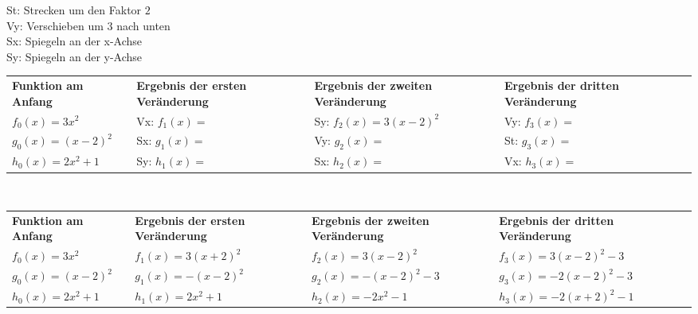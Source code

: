 \documentclass[a4paper,ngerman,12pt]{exam}
\begin{document}
\begin{questions}
  St: Strecken um den Faktor $2$\\
  Vy: Verschieben um 3 nach unten\\
  Sx: Spiegeln an der x-Achse\\
  Sy: Spiegeln an der y-Achse\\
  \begin{table}[h!]
    \begin{tabular}{|m{3cm}|m{4cm}|m{4cm}|m{4cm}|l}
      \cline{1-4}
      \textbf{Funktion am Anfang} & \textbf{Ergebnis der ersten Veränderung} & \textbf{Ergebnis der zweiten Veränderung} & \textbf{Ergebnis der dritten Veränderung} & \\[4ex] \cline{1-4}
      $f_0(x)=3x^2$               & Vx: $f_1(x)=$                            & Sy: $f_2(x)=3(x-2)^2$                     & Vy: $f_3(x)=$                             & \\[3ex] \cline{1-4}
      $g_0(x)=(x-2)^2$            & Sx: $g_1(x)=$                            & Vy: $g_2(x)=$                             & St: $g_3(x)=$                             & \\[3ex] \cline{1-4}
      $h_0(x)=2x^2+1$             & Sy: $h_1(x)=$                            & Sx: $h_2(x)=$                             & Vx: $h_3(x)=$                             & \\[3ex] \cline{1-4}
    \end{tabular}
  \end{table}
  \begin{solution}\phantom{x}\\
    \begin{small}
      \begin{tabular}{|m{2.5cm}|m{3.5cm}|m{3.5cm}|m{4cm}|l}
        \cline{1-4}
        \textbf{Funktion am Anfang} & \textbf{Ergebnis der ersten Veränderung} & \textbf{Ergebnis der zweiten Veränderung} & \textbf{Ergebnis der dritten Veränderung} & \\[4ex] \cline{1-4}
        $f_0(x)=3x^2$               & $f_1(x)=3(x+2)^2$                        & $f_2(x)=3(x-2)^2$                         & $f_3(x)=3(x-2)^2-3$                       & \\[3ex] \cline{1-4}
        $g_0(x)=(x-2)^2$            & $g_1(x)=-(x-2)^2$                        & $g_2(x)=-(x-2)^2-3$                       & $g_3(x)=-2(x-2)^2-3$                      & \\[3ex] \cline{1-4}
        $h_0(x)=2x^2+1$             & $h_1(x)=2x^2+1$                          & $h_2(x)=-2x^2-1$                          & $h_3(x)=-2(x+2)^2-1$                      & \\[3ex] \cline{1-4}
      \end{tabular}
    \end{small}
  \end{solution}

\end{questions}
\end{document}
